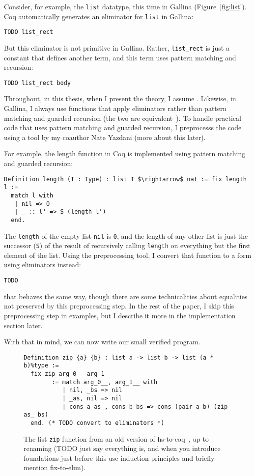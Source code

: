 Consider, for example, the \lstinline{list} datatype, this time in Gallina (Figure~\ref{fig:list}).
Coq automatically generates an eliminator for \lstinline{list} in Gallina:

\begin{lstlisting}
TODO list_rect
\end{lstlisting}
But this eliminator is not primitive in Gallina.
Rather, \lstinline{list_rect} is just a constant that defines another term,
and this term uses pattern matching and recursion:

\begin{lstlisting}
TODO list_rect body
\end{lstlisting}

Throughout, in this thesis, when I present the theory, I assume .
Likewise, in Gallina, I always use functions that apply eliminators rather than pattern matching
and guarded recursion (the two are equivalent~\cite{TODO}).
To handle practical code that uses pattern matching and guarded recursion,
I preprocesss the code using a tool by my coauthor Nate Yazdani (more about this later).

For example, the length function in Coq is implemented using pattern matching and guarded recursion:

\begin{lstlisting}
Definition length (T : Type) : list T $\rightarrow$ nat := fix length l :=
  match l with
   | nil => O
   | _ :: l' => S (length l')
  end.
\end{lstlisting}
The \lstinline{length} of the empty list \lstinline{nil} is \lstinline{0}, and the length of any other list
is just the successor (\lstinline{S}) of the result of recursively calling \lstinline{length} on everything but the first element of the list.
Using the preprocessing tool, I convert that function to a form using eliminators instead:

\begin{lstlisting}
TODO
\end{lstlisting}
that behaves the same way, though there are some technicalities about equalities not preserved by this preprocessing step.
In the rest of the paper, I skip this preprocessing step in examples, but I describe it more in the implementation section later.

With that in mind, we can now write our small verified program.

\begin{figure}
\begin{lstlisting}
Definition zip {a} {b} : list a -> list b -> list (a * b)%type :=
  fix zip arg_0__ arg_1__
        := match arg_0__, arg_1__ with
           | nil, _bs => nil
           | _as, nil => nil
           | cons a as_, cons b bs => cons (pair a b) (zip as_ bs)
  end. (* TODO convert to eliminators *)
\end{lstlisting}
\caption{The list \lstinline{zip} function from an old version of hs-to-coq~\cite{TODO}, up to renaming (TODO just say everything is, and when you introduce foundations just before this use induction principles and briefly mention fix-to-elim).}
\label{fig:zip}
\end{figure}

